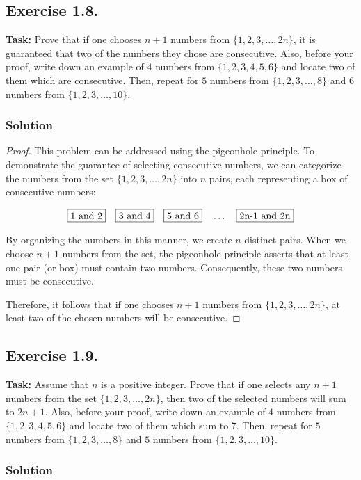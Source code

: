 \documentclass{article}
\begin{document}
\newpage

\subsection{Exercise 1.8.}
\textbf{Task:} Prove that if one chooses $n + 1$ numbers from $\{1,2,3,\dots,2n\}$, it is guaranteed that two of the numbers they chose are consecutive. Also, before your proof, write down an example of $4$ numbers from $\{1,2,3,4,5,6\}$ and locate two of them which are consecutive. Then, repeat for $5$ numbers from $\{1,2,3,\dots,8\}$ and $6$ numbers from $\{1,2,3,\dots,10\}$.

\subsubsection*{Solution}

\begin{proof}
    This problem can be addressed using the pigeonhole principle. To demonstrate the guarantee of selecting consecutive numbers, we can categorize the numbers from the set $\{1, 2, 3, \ldots, 2n\}$ into $n$ pairs, each representing a box of consecutive numbers:

    \[
    \fbox{1 and 2} \quad \fbox{3 and 4} \quad \fbox{5 and 6} \quad \dots \quad \fbox{2n-1 and 2n}
    \]

    By organizing the numbers in this manner, we create $n$ distinct pairs. When we choose $n + 1$ numbers from the set, the pigeonhole principle asserts that at least one pair (or box) must contain two numbers. Consequently, these two numbers must be consecutive.

    Therefore, it follows that if one chooses $n + 1$ numbers from $\{1, 2, 3, \ldots, 2n\}$, at least two of the chosen numbers will be consecutive.
\end{proof}

\subsection{Exercise 1.9.}
\textbf{Task:} Assume that $n$ is a positive integer. Prove that if one selects any $n + 1$ numbers from the set $\{1,2,3,\dots,2n\}$, then two of the selected numbers will sum to $2n+1$. Also, before your proof, write down an example of $4$ numbers from $\{1,2,3,4,5,6\}$ and locate two of them which sum to 7. Then, repeat for $5$ numbers from $\{1,2,3,\dots,8\}$ and $5$ numbers from $\{1,2,3,\dots,10\}$.

\subsubsection*{Solution}
\end{document}

